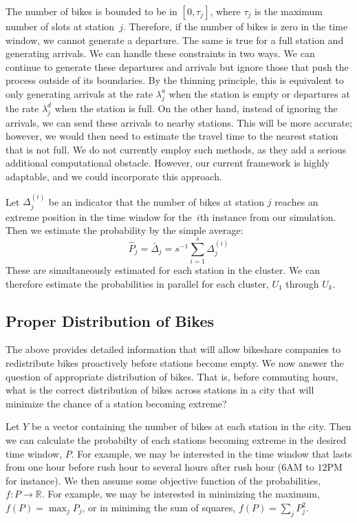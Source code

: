 \documentclass{acm_proc_article-sp}
\begin{document}
The number of bikes is bounded to be in $[0, \tau_j]$, where $\tau_j$ is the maximum number of slots at station~$j$.  Therefore, if the number of bikes is zero in the time window, we cannot generate a departure.  The same is true for a full station and generating arrivals.  We can handle these constraints in two ways.  We can continue to generate these departures and arrivals but ignore those that push the process outside of its boundaries.  By the thinning principle, this is equivalent to only generating arrivals at the rate $\lambda^{a}_j$ when the station is empty or departures at the rate $\lambda^{d}_j$ when the station is full.   On the other hand, instead of ignoring the arrivals, we can send these arrivals to nearby stations.  This will be more accurate; however, we would then need to estimate the travel time to the nearest station that is not full.  We do not currently employ such methods, as they add a serious additional computational obstacle.  However, our current framework is highly adaptable, and we could incorporate this approach.

Let $\Delta^{(i)}_j$ be an indicator that the number of bikes at station $j$ reaches an extreme position in the time window for the~$i$th instance from our simulation.  Then we estimate the probability by the simple average:
\begin{equation*}
\hat{P}_j = \bar{\Delta}_j = s^{-1} \sum_{i=1}^s \Delta^{(i)}_j
\end{equation*}
\noindent  These are simultaneously estimated for each station in the cluster.  We can therefore estimate the probabilities in parallel for each cluster, $U_1$ through $U_k$.

\subsection{Proper Distribution of Bikes}

The above provides detailed information that will allow bikeshare companies to redistribute bikes  proactively before stations become empty.  We now answer the question of appropriate distribution of bikes.  That is, before commuting hours, what is the correct distribution of bikes across stations in a city that will minimize the chance of a station becoming extreme? 

Let $Y$ be a vector containing the number of bikes at each station in the city.  Then we can calculate the probabilty of each stations becoming extreme in the desired time window, $P$.  For example, we may be interested in the time window that lasts from one hour before rush hour to several hours after rush hour ($6$AM to $12$PM for instance).  We then assume some objective function of the probabilities, $f: P \rightarrow \mathbb{R}$.  For example, we may be interested in minimizing the maximum, $f(P) = \max_j P_j$, or in miniming the sum of squares, $f(P) = \sum_j P_j^2$.  
\end{document}
